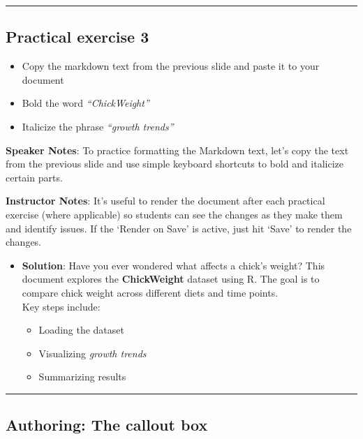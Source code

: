 \documentclass[
  letterpaper,
  DIV=11,
  numbers=noendperiod]{scrartcl}
\providecommand{\tightlist}{%
  \setlength{\itemsep}{0pt}\setlength{\parskip}{0pt}}
\begin{document}
\begin{center}\rule{0.5\linewidth}{0.5pt}\end{center}

\subsection{Practical exercise 3}\label{practical-exercise-3}

\begin{itemize}
\tightlist
\item[$\square$]
  Copy the markdown text from the previous slide and paste it to your
  document
\item[$\square$]
  Bold the word \emph{``ChickWeight''}
\item[$\square$]
  Italicize the phrase \emph{``growth trends''}
\end{itemize}

\textbf{Speaker Notes}: To practice formatting the Markdown text, let's
copy the text from the previous slide and use simple keyboard shortcuts
to bold and italicize certain parts.

\textbf{Instructor Notes}: It's useful to render the document after each
practical exercise (where applicable) so students can see the changes as
they make them and identify issues. If the `Render on Save' is active,
just hit `Save' to render the changes.

\begin{itemize}
\item
  \textbf{Solution}: Have you ever wondered what affects a chick's
  weight? This document explores the \textbf{ChickWeight} dataset using
  R. The goal is to compare chick weight across different diets and time
  points.\\
  Key steps include:

  \begin{itemize}
  \item
    Loading the dataset
  \item
    Visualizing \emph{growth trends}
  \item
    Summarizing results
  \end{itemize}
\end{itemize}

\begin{center}\rule{0.5\linewidth}{0.5pt}\end{center}

\subsection{Authoring: The callout box}\label{authoring-the-callout-box}
\end{document}
